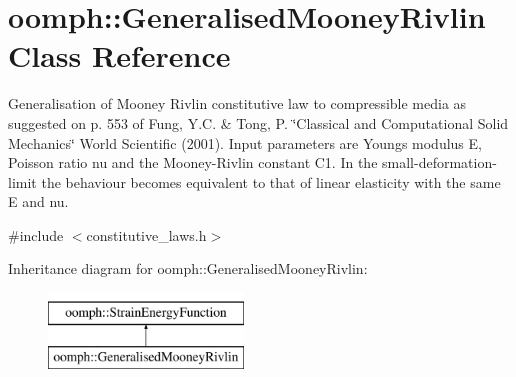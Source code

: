 \hypertarget{classoomph_1_1GeneralisedMooneyRivlin}{}\section{oomph\+:\+:Generalised\+Mooney\+Rivlin Class Reference}
\label{classoomph_1_1GeneralisedMooneyRivlin}


Generalisation of Mooney Rivlin constitutive law to compressible media as suggested on p. 553 of Fung, Y.\+C. \& Tong, P. \char`\"{}\+Classical and 
\+Computational Solid Mechanics\char`\"{} World Scientific (2001). Input parameters are Young\textquotesingle{}s modulus E, Poisson ratio nu and the Mooney-\/\+Rivlin constant C1. In the small-\/deformation-\/limit the behaviour becomes equivalent to that of linear elasticity with the same E and nu.  




{\ttfamily \#include $<$constitutive\+\_\+laws.\+h$>$}

Inheritance diagram for oomph\+:\+:Generalised\+Mooney\+Rivlin\+:\begin{figure}[H]
\begin{center}
\leavevmode
\includegraphics[height=2.000000cm]{classoomph_1_1GeneralisedMooneyRivlin}
\end{center}
\end{figure}
